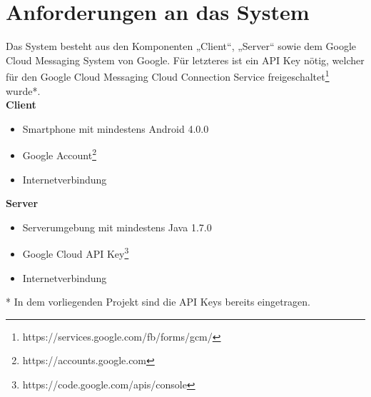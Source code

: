 
\section{Anforderungen an das System}

Das System besteht aus den Komponenten „Client“, „Server“ sowie dem Google Cloud Messaging System von Google. Für letzteres ist ein API Key nötig, welcher für den Google Cloud Messaging Cloud Connection Service freigeschaltet\footnote{https://services.google.com/fb/forms/gcm/} wurde*.\\


\textbf{Client}

\begin{itemize}
	\item Smartphone mit mindestens Android 4.0.0
	\item Google Account\footnote{https://accounts.google.com}
	\item Internetverbindung
\end{itemize}

\textbf{Server}

\begin{itemize}
	\item Serverumgebung mit mindestens Java 1.7.0
	\item Google Cloud API Key\footnote{https://code.google.com/apis/console‎}
	\item Internetverbindung
\end{itemize}

* In dem vorliegenden Projekt sind die API Keys bereits eingetragen.
